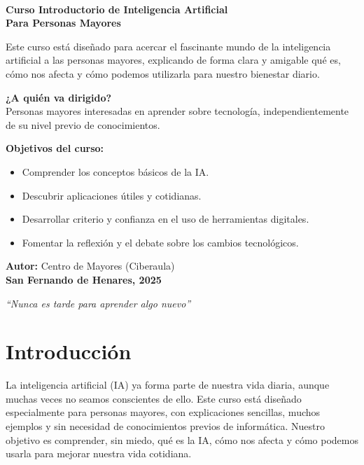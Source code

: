 \documentclass[12pt]{article}
\begin{document}
	\newpage
	~
	\thispagestyle{empty}
	\vspace*{2cm}
	\begin{center}
		\textbf{\Large Curso Introductorio de Inteligencia Artificial}\\[1ex]
		\textbf{Para Personas Mayores}\\[4ex]
	\end{center}
	
	\noindent Este curso está diseñado para acercar el fascinante mundo de la inteligencia artificial a las personas mayores, explicando de forma clara y amigable qué es, cómo nos afecta y cómo podemos utilizarla para nuestro bienestar diario.
	
	\vspace{1cm}
	\textbf{¿A quién va dirigido?}\\
	Personas mayores interesadas en aprender sobre tecnología, independientemente de su nivel previo de conocimientos.
	
	\vspace{0.5cm}
	\textbf{Objetivos del curso:}
	\begin{itemize}
		\item Comprender los conceptos básicos de la IA.
		\item Descubrir aplicaciones útiles y cotidianas.
		\item Desarrollar criterio y confianza en el uso de herramientas digitales.
		\item Fomentar la reflexión y el debate sobre los cambios tecnológicos.
	\end{itemize}
	
	\vspace{0.5cm}
	\textbf{Autor:} Centro de Mayores (Ciberaula)\\
	\textbf{San Fernando de Henares, 2025}
	
	\vfill
	\begin{center}
		\textit{“Nunca es tarde para aprender algo nuevo”}
	\end{center}
	
	\newpage
	
	\tableofcontents
	\newpage
	
	\section*{Introducción}
	La inteligencia artificial (IA) ya forma parte de nuestra vida diaria, aunque muchas veces no seamos conscientes de ello. Este curso está diseñado especialmente para personas mayores, con explicaciones sencillas, muchos ejemplos y sin necesidad de conocimientos previos de informática. Nuestro objetivo es comprender, sin miedo, qué es la IA, cómo nos afecta y cómo podemos usarla para mejorar nuestra vida cotidiana.
	
\end{document}

